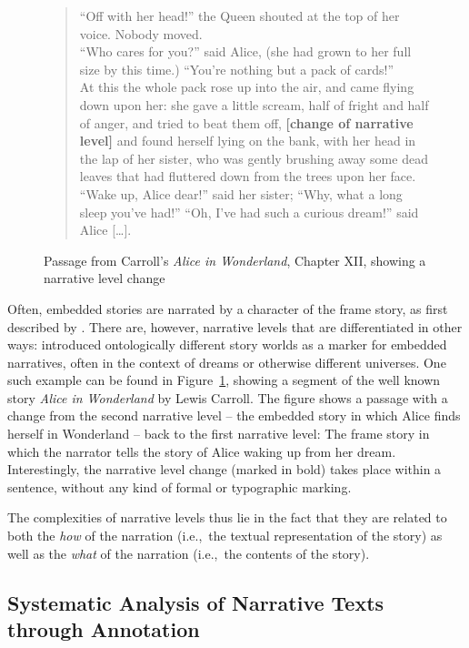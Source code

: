 \documentclass[10pt, a4paper]{article}
\begin{document}
\begin{figure}
\begin{quote}
\enquote{Off with her head!} the Queen shouted at the top of her voice. Nobody moved.\\
\enquote{Who cares for you?} said Alice, (she had grown to her full size by this time.) \enquote{You're nothing but a pack of cards!}\\
At this the whole pack rose up into the air, and came flying down upon her: she gave a little scream, half of fright and half of anger, and tried to beat them off, \textbf{[change of narrative level]} and found herself lying on the bank, with her head in the lap of her sister, who was gently brushing away some dead leaves that had fluttered down from the trees upon her face.
\enquote{Wake up, Alice dear!} said her sister; \enquote{Why, what a long sleep you've had!}
\enquote{Oh, I've had such a curious dream!} said Alice [\dots].
\end{quote}
\caption{Passage from Carroll's \textit{Alice in Wonderland}, Chapter XII, showing a narrative level change}
\label{fig:alice}
\end{figure}

Often, embedded stories are narrated by a character of the frame story, as first described by \cite{Genette:1980aa}. There are, however, narrative levels that are differentiated in other ways: \cite{ryan_1991} introduced ontologically different story worlds as a marker for embedded narratives,  often in the context of dreams or otherwise different universes. One such example can be found in Figure~\ref{fig:alice}, showing a segment of the well known story \textit{Alice in Wonderland} by Lewis Carroll. The figure shows a passage with a change from the second narrative level -- the embedded story in which Alice finds herself in Wonderland -- back to the first narrative level: The frame story in which the narrator tells the story of Alice waking up from her dream. Interestingly, the narrative level change (marked in bold) takes place within a sentence, without any kind of formal or typographic marking.

The complexities of narrative levels thus lie in the fact that they are related to both the \textit{how} of the narration (i.e.,~the textual representation of the story) as well as the \textit{what} of the narration (i.e.,~the contents of the story).

\subsection{Systematic Analysis of Narrative Texts through Annotation}
\end{document}
